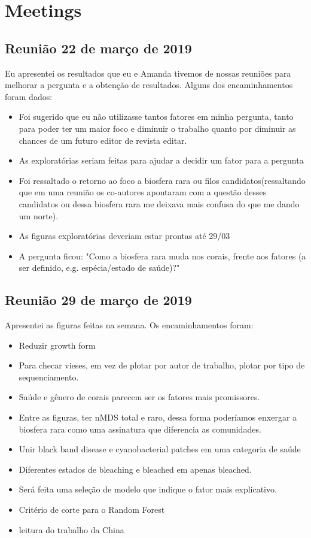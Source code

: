 \documentclass[12pt, a4paper]{report}
\begin{document}
\chapter{Meetings}
\section{Reunião 22 de março de 2019}
Eu apresentei os resultados que eu e Amanda tivemos de nossas reuniões para melhorar a pergunta e a obtenção de resultados. Alguns dos encaminhamentos foram dados: \\
\begin{itemize}
	\item Foi sugerido que eu não utilizasse tantos fatores em minha pergunta, tanto para poder ter um maior foco e diminuir o trabalho quanto por diminuir as chances de um futuro editor de revista editar. 
	\item As exploratórias seriam feitas para ajudar a decidir um fator para a pergunta
	\item Foi ressaltado o retorno ao foco a biosfera rara ou filos candidatos(ressaltando que em uma reunião os co-autores apontaram com a questão desses candidatos ou dessa biosfera rara me deixava mais confusa do que me dando um norte).
	\item As figuras exploratórias deveriam estar prontas até 29/03
	\item A pergunta ficou: "Como a biosfera rara muda nos corais, frente aos fatores (a ser definido, e.g. espécia/estado de saúde)?"
\end{itemize}

\section{Reunião 29 de março de 2019}
Apresentei as figuras feitas na semana. Os encaminhamentos foram:
\begin{itemize}
	\item Reduzir growth form 
	\item Para checar vieses, em vez de plotar por autor de trabalho, plotar por tipo de sequenciamento.
	\item Saúde e gênero de corais parecem ser os fatores mais promissores. 
	\item Entre as figuras, ter nMDS total e raro, dessa forma poderíamos enxergar a biosfera rara como uma assinatura que diferencia as comunidades. 
	\item Unir black band disease e cyanobacterial patches em uma categoria de saúde
	\item Diferentes estados de bleaching e bleached em apenas bleached. 
	\item Será feita uma seleção de modelo que indique o fator mais explicativo.
	\item Critério de corte para o Random Forest
	\item leitura do trabalho da China
\end{itemize}
\end{document}
